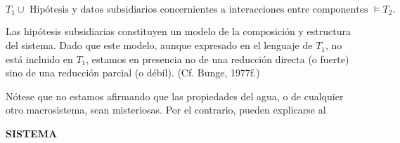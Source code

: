 {\[T_1 \cup \text{ Hipótesis y datos subsidiarios concernientes a interacciones entre componentes } \models T_2.\]

Las hipótesis subsidiarias constituyen un modelo de la composición y estructura del sistema. Dado que este modelo, aunque expresado en el lenguaje de \( T_1 \), no está incluido en \( T_1 \), 
estamos en presencia no de una reducción directa (o fuerte) sino de una reducción parcial (o débil). (Cf. Bunge, 1977f.)

Nótese que no estamos afirmando que las propiedades del agua, o de cualquier otro macrosistema, sean misteriosas. Por el contrario, pueden explicarse al
}

\newpage
\fancyhf{}
\fancyhead[r]{\thepage}
\begin{center}
{\fontsize{16}{18}\selectfont \textbf{SISTEMA}}
\end{center}
\vspace{0.5cm}

